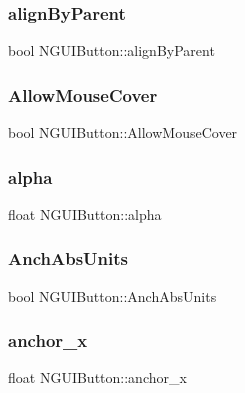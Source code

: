 \subsubsection{\texorpdfstring{align\+By\+Parent}{alignByParent}}
{\footnotesize\ttfamily bool N\+G\+U\+I\+Button\+::align\+By\+Parent}

\hypertarget{class_n_g_u_i_button_a7b45b9acace197bc5be17bee98d93056}{}\label{class_n_g_u_i_button_a7b45b9acace197bc5be17bee98d93056} 
\subsubsection{\texorpdfstring{Allow\+Mouse\+Cover}{AllowMouseCover}}
{\footnotesize\ttfamily bool N\+G\+U\+I\+Button\+::\+Allow\+Mouse\+Cover}

\hypertarget{class_n_g_u_i_button_ad9eefbf3fe64612a08c2c257082247b6}{}\label{class_n_g_u_i_button_ad9eefbf3fe64612a08c2c257082247b6} 
\subsubsection{\texorpdfstring{alpha}{alpha}}
{\footnotesize\ttfamily float N\+G\+U\+I\+Button\+::alpha}

\hypertarget{class_n_g_u_i_button_a91fd075ce7f5e451667c0f3684313e7f}{}\label{class_n_g_u_i_button_a91fd075ce7f5e451667c0f3684313e7f} 
\subsubsection{\texorpdfstring{Anch\+Abs\+Units}{AnchAbsUnits}}
{\footnotesize\ttfamily bool N\+G\+U\+I\+Button\+::\+Anch\+Abs\+Units}

\hypertarget{class_n_g_u_i_button_a81f415517223065843ff35c5dae82e83}{}\label{class_n_g_u_i_button_a81f415517223065843ff35c5dae82e83} 
\subsubsection{\texorpdfstring{anchor\+\_\+x}{anchor\_x}}
{\footnotesize\ttfamily float N\+G\+U\+I\+Button\+::anchor\+\_\+x}

